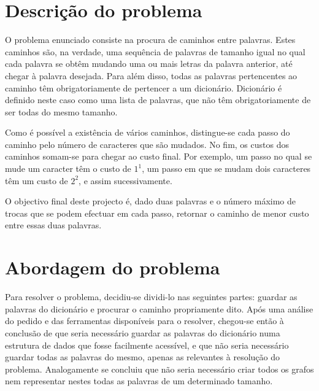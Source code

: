 \documentclass[a4paper, 11pt]{article}
\begin{document}


\pagestyle{fancy}
\tableofcontents
\newpage

\section{Descrição do problema}
    \par O problema enunciado consiste na procura de caminhos entre palavras. Estes caminhos são, na verdade, uma sequência de palavras de tamanho igual no qual cada palavra se obtêm mudando uma ou mais letras da palavra anterior, até chegar à palavra desejada. Para além disso, todas as palavras pertencentes ao caminho têm obrigatoriamente de pertencer a um dicionário. Dicionário é definido neste caso como uma lista de palavras, que não têm obrigatoriamente de ser todas do mesmo tamanho.
    \par Como é possível a existência de vários caminhos, distingue-se cada passo do caminho pelo número de caracteres que são mudados. No fim, os custos dos caminhos somam-se para chegar ao custo final. Por exemplo, um passo no qual se mude um caracter têm o custo de $1^1$, um passo em que se mudam dois caracteres têm um custo de $2^2$, e assim sucessivamente.
    \par O objectivo final deste projecto é, dado duas palavras e o número máximo de trocas que se podem efectuar em cada passo, retornar o caminho de menor custo entre essas duas palavras.
    
\section{Abordagem do problema}
    \par Para resolver o problema, decidiu-se dividi-lo nas seguintes partes: guardar as palavras do dicionário e procurar o caminho propriamente dito. Após uma análise do pedido e das ferramentas disponíveis para o resolver, chegou-se então à conclusão de que seria necessário guardar as palavras do dicionário numa estrutura de dados que fosse facilmente acessível, e que não seria necessário guardar todas as palavras do mesmo, apenas as relevantes à resolução do problema. Analogamente se concluiu que não seria necessário criar todos os grafos nem representar nestes todas as palavras de um determinado tamanho.
\end{document}
